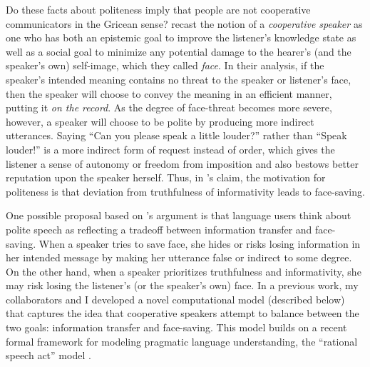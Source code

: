 Do these facts about politeness imply that people are not cooperative communicators in the Gricean sense? \citet{Brown1987} recast the notion of a \emph{cooperative speaker} as one who has both an epistemic goal to improve the listener's knowledge state as well as a social goal to minimize any potential damage to the hearer's (and the speaker's own) self-image, which they called \emph{face}. In their analysis, if the speaker's intended meaning contains no threat to the speaker or listener's face, then the speaker will choose to convey the meaning in an efficient manner, putting it \emph{on the record}. As the degree of face-threat becomes more severe, however, a speaker will choose to be polite by producing more indirect utterances. Saying ``Can you please speak a little louder?'' rather than ``Speak louder!'' is a more indirect form of request instead of order, which gives the listener a sense of autonomy or freedom from imposition and also bestows better reputation upon the speaker herself. Thus, in \citet{Brown1987}'s claim, the motivation for politeness is that deviation from truthfulness of informativity leads to face-saving. 

One possible proposal based on \citet{Brown1987}'s argument is that language users think about polite speech as reflecting a tradeoff between information transfer and face-saving. When a speaker tries to save face, she hides or risks losing information in her intended message by making her utterance false or indirect to some degree. On the other hand, when a speaker prioritizes truthfulness and informativity, she may risk losing the listener's (or the speaker's own) face. In a previous work, my collaborators and I developed a novel computational model (described below) that captures the idea that cooperative speakers attempt to balance between the two goals: information transfer and face-saving. This model builds on a recent formal framework for modeling pragmatic language understanding, the ``rational speech act''  model \citep{goodman2016}. 


